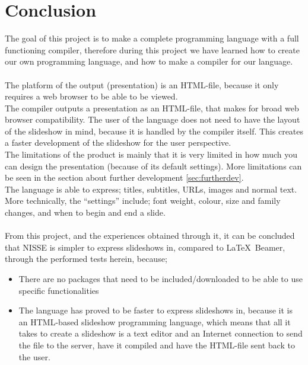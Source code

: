 \chapter{Conclusion}

The goal of this project is to make a complete programming language with a full functioning compiler, therefore during this project we have learned how to create our own programming language, and how to make a compiler for our language. \\

 \\
The platform of the output (presentation) is an HTML-file, because it only requires a web browser to be able to be viewed. \\
The compiler outputs a presentation as an HTML-file, that makes for broad web browser compatibility. The user of the language does not need to have the layout of the slideshow in mind, because it is handled by the compiler itself. This creates a faster development of the slideshow for the user perspective. \\
The limitations of the product is mainly that it is very limited in how much you can design the presentation (because of its default settings). More limitations can be seen in the section about further development \ref{sec:furtherdev}. \\
The language is able to express; titles, subtitles, URLs, images and normal text. \\
More technically, the ``settings'' include; font weight, colour, size and family changes, and when to begin and end a slide.
\\ \\
From this project, and the experiences obtained through it, it can be concluded that NISSE is simpler to express slideshows in, compared to \LaTeX~Beamer, through the performed tests herein, because;
\begin{itemize}
	\item There are no packages that need to be included/downloaded to be able to use specific functionalities
	\item The language has proved to be faster to express slideshows in, because it is an HTML-based slideshow programming language, which means that all it takes to create a slideshow is a text editor and an Internet connection to send the file to the server, have it compiled and have the HTML-file sent back to the user.
\end{itemize}